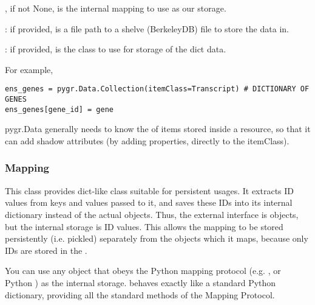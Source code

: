 \documentclass{howto}
\begin{document}
, if not None, is the internal mapping to use as our storage.

: if provided, is a file path to a shelve (BerkeleyDB) file to
  store the data in.
   
: if provided, is the class to use for storage of the dict data.

For example,
\begin{verbatim}
ens_genes = pygr.Data.Collection(itemClass=Transcript) # DICTIONARY OF GENES
ens_genes[gene_id] = gene
\end{verbatim}
pygr.Data generally needs to know the  of items stored
inside a resource, so that it can add shadow attributes (by adding properties,
directly to the itemClass).

\subsubsection{Mapping}
This class provides dict-like class suitable for persistent usages.  
It extracts ID values from
keys and values passed to it, and saves these IDs into its internal dictionary
instead of the actual objects.  Thus, the external interface is objects,
but the internal storage is ID values.  This allows the mapping to be stored
persistently (i.e. pickled) separately from the objects which it maps, 
because only IDs are stored in the .

You can use any object that obeys the
Python mapping protocol (e.g. , or Python ) 
as the internal storage.   behaves exactly like a standard
Python dictionary, providing all the standard methods of the Mapping Protocol.
\end{document}
